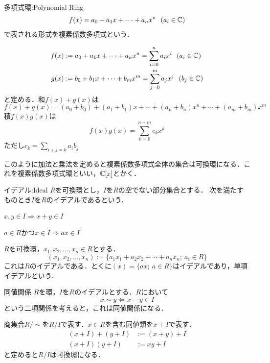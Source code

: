 \documentclass[dvipdfmx, leqno]{jsreport}
\begin{document}
\begin{soudef}{多項式環:Polynomial Ring}
\begin{equation*}
    f(x)= a_0+ a_1x+ \cdots+ a_nx^n\ \ (a_i\in \mathbb{C})
\end{equation*}
    で表される形式を複素係数多項式という．
\end{soudef}

\begin{souexample}
\begin{align*}
    f(x)&:= a_0+ a_1x+ \cdots+ a_nx^n= \sum_{i= 0}^n a_ix^i\ \ (a_i\in \C)\\
    g(x)&:= b_0+ b_1x+ \cdots+ b_mx^m= \sum_{j= 0}^m a_jx^j\ \ (b_j\in \C)
\end{align*}
    と定める．和$f(x)+ g(x)$は
\begin{equation*}
    f(x)+ g(x)= (a_0+ b_0)+ (a_1+ b_1)x+ \cdots+ (a_n+ b_n)x^n+ \cdots+ (a_m+ b_m)x^m
\end{equation*}
    積$f(x)g(x)$は
\begin{equation*}
    f(x)g(x)= \sum_{k= 0}^{n+ m} c_k x^k
\end{equation*}
    ただし$c_k= \sum_{i+ j= k} a_ib_j$
\end{souexample}
    このように加法と乗法を定めると複素係数多項式全体の集合は可換環になる．これを複素係数多項式環といい，$\mathbb{C}[x]$とかく．
\begin{soudef}{イデアル:Ideal}
    $R$を可換環とし，$I$を$R$の空でない部分集合とする．
    次を満たすものとき$I$を$R$のイデアルであるという．
\begin{enumerate_roman}
    \item $x, y\in I\Rightarrow x+ y\in I$
    \item $a\in R$かつ$x\in I\Rightarrow ax\in I$
\end{enumerate_roman}
\end{soudef}
\begin{sounotation}
    $R$を可換環，$x_1, x_2, \ldots, x_n\in R$とする．
\begin{equation*}
    (x_1, x_2, \ldots, x_n):= \{a_1x_1+ a_2x_2+ \cdots+ a_nx_n;\ a_i\in R\}
\end{equation*}
    これは$R$のイデアルである．とくに$(x)= \{ax;\ a\in R\}$はイデアルであり，単項イデアルという．
\end{sounotation}

\begin{soudef}{同値関係}
    $R$を環，$I$を$R$のイデアルとする．$R$において
\begin{equation*}
    x\sim y\iff x- y\in I
\end{equation*}
    という二項関係を考えると，これは同値関係になる．
\end{soudef}
    商集合$R\slash\! \sim$を$R\slash I$で表す．$x\in R$を含む同値類を$x+ I$で表す．
\begin{align*}
    (x+ I)+ (y+ I)&:= (x+ y)+ I\\
    (x+ I)(y+ I)&:= xy+ I
\end{align*}
    と定めると$R\slash I$は可換環になる．
\end{document}
